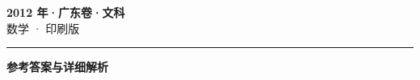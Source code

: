 \documentclass[zihao=5, a4paper]{ctexart}
\begin{document}
\begin{center}
  {\Large\bfseries 2012 年·广东卷·文科}\\[4pt]
  {\large 数学 · 印刷版}
\end{center}
\medskip
{}

\par\bigskip\hrule\bigskip
{}
\Needspace{0.55\textheight}
\begin{center}{\large\bfseries 参考答案与详细解析}\end{center}
\smallskip

\end{document}
